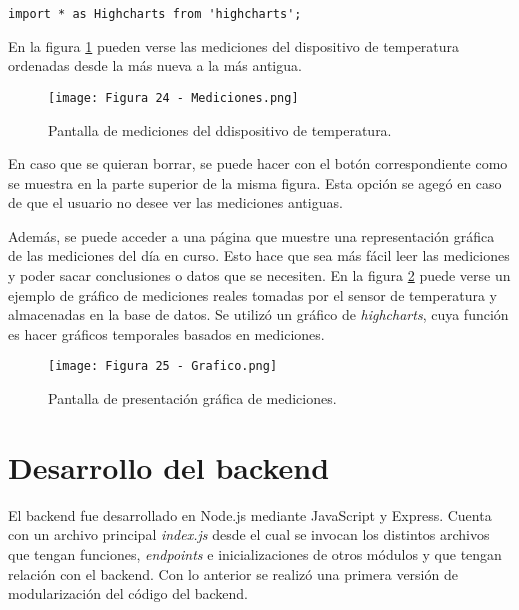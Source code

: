 \begin{lstlisting}[caption={Importación de gráfico de \textit{highcharts}.}, label={lst:highcharts}]
import * as Highcharts from 'highcharts';
\end{lstlisting}

En la figura \ref{fig:24} pueden verse las mediciones del dispositivo de temperatura ordenadas desde la más nueva a la más antigua.

\begin{figure}[h]
\centering
\texttt{[image: Figura 24 - Mediciones.png]}
\caption[Pantalla de mediciones del ddispositivo de temperatura]{Pantalla de mediciones del ddispositivo de temperatura. \footnotemark}
\label{fig:24}
\end{figure}

En caso que se quieran borrar, se puede hacer con el botón correspondiente como se muestra en la parte superior de la misma figura. Esta opción se agegó en caso de que el usuario no desee ver las mediciones antiguas.

Además, se puede acceder a una página que muestre una representación gráfica de las mediciones del día en curso. Esto hace que sea más fácil leer las mediciones y poder sacar conclusiones o datos que se necesiten. En la figura \ref{fig:25} puede verse un ejemplo de gráfico de mediciones reales tomadas por el sensor de temperatura y almacenadas en la base de datos. Se utilizó un gráfico de \textit{highcharts}, cuya función es hacer gráficos temporales basados en mediciones.

\begin{figure}[h]
\centering
\texttt{[image: Figura 25 - Grafico.png]}
\caption[Pantalla de presentación gráfica de mediciones]{Pantalla de presentación gráfica de mediciones. \footnotemark}
\label{fig:25}
\end{figure}

\section{Desarrollo del backend}

El backend fue desarrollado en Node.js mediante JavaScript y Express. Cuenta con un archivo principal \textit{index.js} desde el cual se invocan los distintos archivos que tengan funciones, \textit{endpoints} e inicializaciones de otros módulos y que tengan relación con el backend. Con lo anterior se realizó una primera versión de modularización del código del backend.

